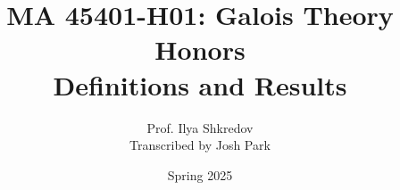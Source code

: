 \documentclass{article}
\title{MA 45401-H01: Galois Theory Honors\\Definitions and Results}
\author{Prof. Ilya Shkredov \\ Transcribed by Josh Park}
\date{Spring 2025}
\begin{document}
\maketitle
\tableofcontents
\pagebreak

















\end{document}
